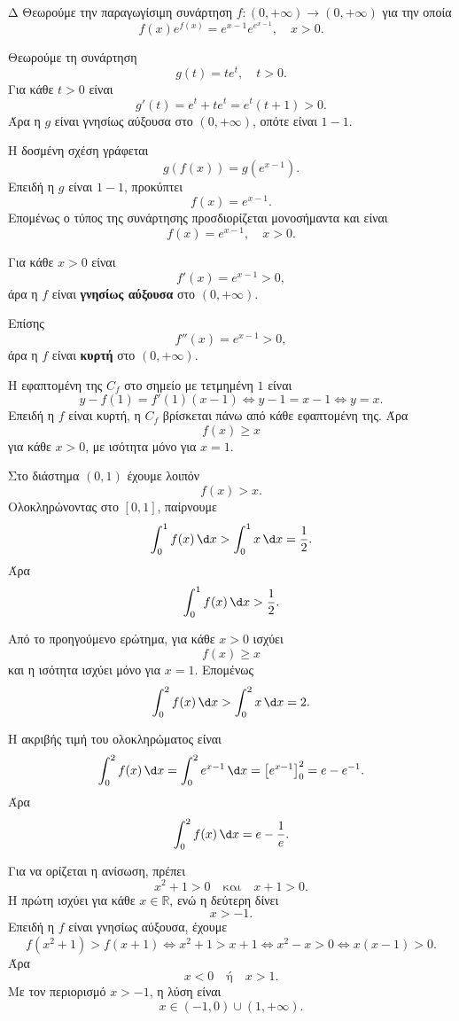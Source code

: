 \begin{thema}{Δ}
Θεωρούμε την παραγωγίσιμη συνάρτηση $f:(0,+\infty)\to(0,+\infty)$ για την οποία
\[
f(x)e^{f(x)}=e^{x-1}e^{e^{x-1}},\quad x>0.
\]
\begin{erwthma}
\item Θεωρούμε τη συνάρτηση
\[
g(t)=te^t,\quad t>0.
\]
Για κάθε $t>0$ είναι
\[
g'(t)=e^t+te^t=e^t(t+1)>0.
\]
Άρα η $g$ είναι γνησίως αύξουσα στο $(0,+\infty)$, οπότε είναι $1-1$.

Η δοσμένη σχέση γράφεται
\[
g(f(x))=g(e^{x-1}).
\]
Επειδή η $g$ είναι $1-1$, προκύπτει
\[
f(x)=e^{x-1}.
\]
Επομένως ο τύπος της συνάρτησης προσδιορίζεται μονοσήμαντα και είναι
\[
{f(x)=e^{x-1},\quad x>0}.
\]

\item Για κάθε $x>0$ είναι
\[
f'(x)=e^{x-1}>0,
\]
άρα η $f$ είναι \textbf{γνησίως αύξουσα} στο $(0,+\infty)$.

Επίσης
\[
f''(x)=e^{x-1}>0,
\]
άρα η $f$ είναι \textbf{κυρτή} στο $(0,+\infty)$.

Η εφαπτομένη της $C_f$ στο σημείο με τετμημένη $1$ είναι
\[
y-f(1)=f'(1)(x-1)
\Leftrightarrow y-1=x-1
\Leftrightarrow y=x.
\]
Επειδή η $f$ είναι κυρτή, η $C_f$ βρίσκεται πάνω από κάθε εφαπτομένη της. Άρα
\[
f(x)\geq x
\]
για κάθε $x>0$, με ισότητα μόνο για $x=1$.

Στο διάστημα $(0,1)$ έχουμε λοιπόν
\[
f(x)>x.
\]
Ολοκληρώνοντας στο $[0,1]$, παίρνουμε
\[
\dint_0^1 f(x)\,\d x>\dint_0^1 x\,\d x=\frac{1}{2}.
\]
Άρα
\[
{\dint_0^1 f(x)\,\d x>\frac{1}{2}}.
\]

\item Από το προηγούμενο ερώτημα, για κάθε $x>0$ ισχύει
\[
f(x)\geq x
\]
και η ισότητα ισχύει μόνο για $x=1$. Επομένως
\[
\dint_0^2 f(x)\,\d x>\dint_0^2 x\,\d x=2.
\]

Η ακριβής τιμή του ολοκληρώματος είναι
\[
\dint_0^2 f(x)\,\d x=\dint_0^2 e^{x-1}\,\d x
=\left[e^{x-1}\right]_0^2
=e-e^{-1}.
\]
Άρα
\[
{\dint_0^2 f(x)\,\d x=e-\frac{1}{e}}.
\]

\item Για να ορίζεται η ανίσωση, πρέπει
\[
x^2+1>0
\quad\text{και}\quad
x+1>0.
\]
Η πρώτη ισχύει για κάθε $x\in\mathbb{R}$, ενώ η δεύτερη δίνει
\[
x>-1.
\]
Επειδή η $f$ είναι γνησίως αύξουσα, έχουμε
\[
f(x^2+1)>f(x+1)
\Leftrightarrow x^2+1>x+1
\Leftrightarrow x^2-x>0
\Leftrightarrow x(x-1)>0.
\]
Άρα
\[
x<0\quad\text{ή}\quad x>1.
\]
Με τον περιορισμό $x>-1$, η λύση είναι
\[
{x\in(-1,0)\cup(1,+\infty)}.
\]
\end{erwthma}
\end{thema}
